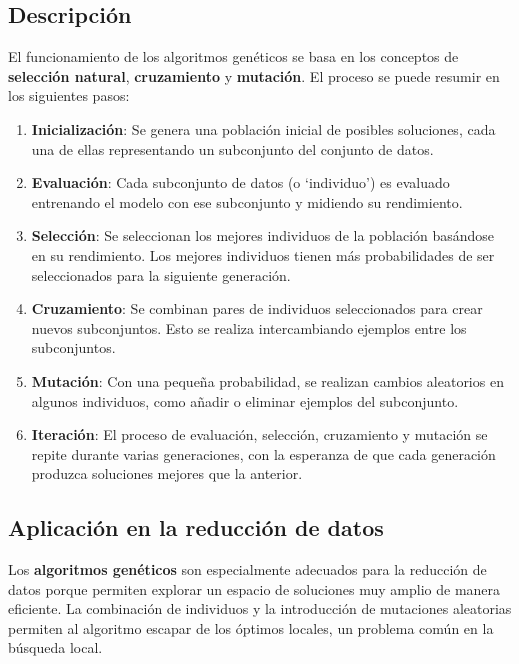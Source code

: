 \subsection{Descripción}\label{subsec:descripcion3}
El funcionamiento de los algoritmos genéticos se basa en los conceptos de \textbf{selección natural},
\textbf{cruzamiento} y \textbf{mutación}.
El proceso se puede resumir en los siguientes pasos:
\begin{enumerate}
      \item \textbf{Inicialización}: Se genera una población inicial de posibles soluciones, cada una de ellas
            representando un subconjunto del conjunto de datos.
      \item \textbf{Evaluación}: Cada subconjunto de datos (o `individuo') es evaluado entrenando el modelo con ese
            subconjunto y midiendo su rendimiento.
      \item \textbf{Selección}: Se seleccionan los mejores individuos de la población basándose en su rendimiento.
            Los mejores individuos tienen más probabilidades de ser seleccionados para la siguiente generación.
      \item \textbf{Cruzamiento}: Se combinan pares de individuos seleccionados para crear nuevos subconjuntos.
            Esto se realiza intercambiando ejemplos entre los subconjuntos.
      \item \textbf{Mutación}: Con una pequeña probabilidad, se realizan cambios aleatorios en algunos individuos, como
            añadir o eliminar ejemplos del subconjunto.
      \item \textbf{Iteración}: El proceso de evaluación, selección, cruzamiento y mutación se repite durante varias
            generaciones, con la esperanza de que cada generación produzca soluciones mejores que la anterior.
\end{enumerate}

\subsection{Aplicación en la reducción de datos}\label{subsec:aplicacion-en-la-reduccion-de-datos3}
Los \textbf{algoritmos genéticos} son especialmente adecuados para la reducción de datos porque permiten explorar un
espacio de soluciones muy amplio de manera eficiente.
La combinación de individuos y la introducción de mutaciones aleatorias permiten al algoritmo escapar de los óptimos
locales, un problema común en la búsqueda local.

